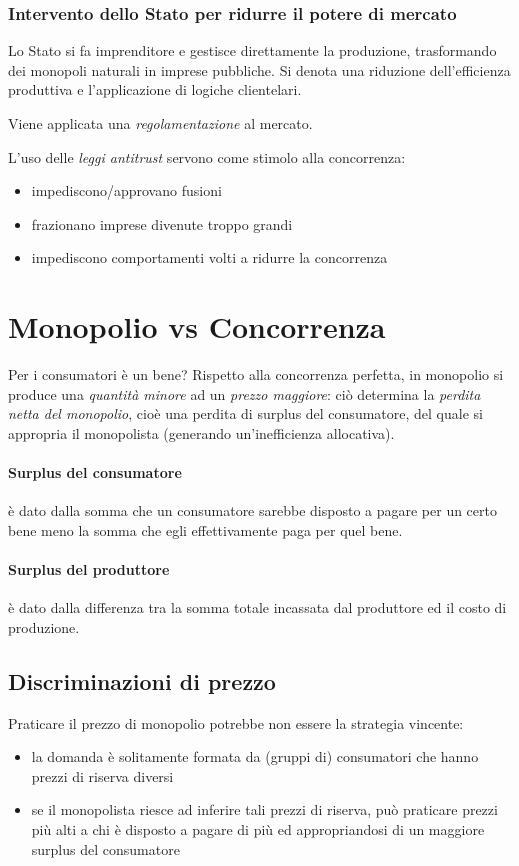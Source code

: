\subsubsection{Intervento dello Stato per ridurre il potere di mercato}
Lo Stato si fa imprenditore e gestisce direttamente la produzione, trasformando dei monopoli naturali in imprese pubbliche.
Si denota una riduzione dell’efficienza produttiva e l'applicazione di logiche clientelari.

Viene applicata una \emph{regolamentazione} al mercato.

L'uso delle \emph{leggi antitrust} servono come stimolo alla concorrenza:
\begin{itemize}
	\item impediscono/approvano fusioni
	\item frazionano imprese divenute troppo grandi
	\item impediscono comportamenti volti a ridurre la concorrenza
\end{itemize}



\section{Monopolio vs Concorrenza}
Per i consumatori è un bene?
Rispetto alla concorrenza perfetta, in monopolio si produce una \emph{quantità minore} ad un \emph{prezzo
maggiore}: ciò determina la \emph{perdita netta del monopolio}, cioè una perdita di surplus del consumatore, del
quale si appropria il monopolista (generando un’inefficienza allocativa).

\paragraph{Surplus del consumatore} è dato dalla somma che un consumatore sarebbe disposto a pagare
per un certo bene meno la somma che egli effettivamente paga per quel bene.

\paragraph{Surplus del produttore} è dato dalla differenza tra la somma totale incassata dal produttore ed il
costo di produzione.

\subsection{Discriminazioni di prezzo}
Praticare il prezzo di monopolio potrebbe non essere la strategia vincente:
\begin{itemize}
	\item la domanda è solitamente formata da (gruppi di) consumatori che hanno prezzi di riserva diversi
	\item se il monopolista riesce ad inferire tali prezzi di riserva, può praticare prezzi più alti a chi è
	disposto a pagare di più ed appropriandosi di un maggiore surplus del consumatore
\end{itemize}

